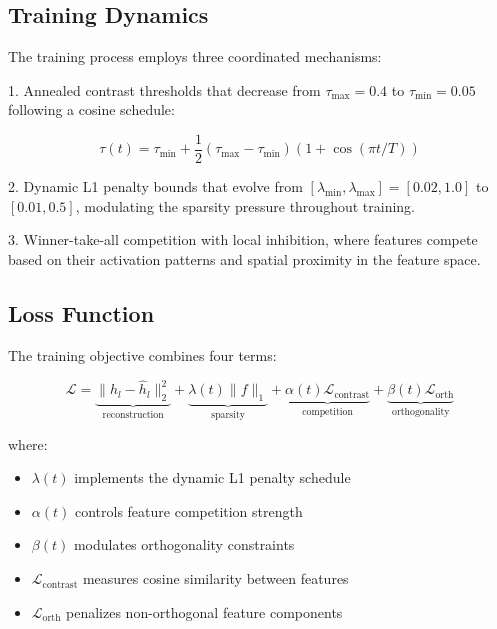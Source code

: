 \documentclass{article} %
\begin{document}
\subsection{Training Dynamics}

The training process employs three coordinated mechanisms:

1. Annealed contrast thresholds that decrease from $\tau_{\text{max}}=0.4$ to $\tau_{\text{min}}=0.05$ following a cosine schedule:

\begin{equation}
\tau(t) = \tau_{\text{min}} + \frac{1}{2}(\tau_{\text{max}} - \tau_{\text{min}})(1 + \cos(\pi t/T))
\end{equation}

2. Dynamic L1 penalty bounds that evolve from $[\lambda_{\text{min}}, \lambda_{\text{max}}] = [0.02, 1.0]$ to $[0.01, 0.5]$, modulating the sparsity pressure throughout training.

3. Winner-take-all competition with local inhibition, where features compete based on their activation patterns and spatial proximity in the feature space.

\subsection{Loss Function}

The training objective combines four terms:

\begin{equation}
\mathcal{L} = \underbrace{\|h_l - \hat{h}_l\|_2^2}_{\text{reconstruction}} + \underbrace{\lambda(t)\|f\|_1}_{\text{sparsity}} + \underbrace{\alpha(t)\mathcal{L}_{\text{contrast}}}_{\text{competition}} + \underbrace{\beta(t)\mathcal{L}_{\text{orth}}}_{\text{orthogonality}}
\end{equation}

where:
\begin{itemize}
\item $\lambda(t)$ implements the dynamic L1 penalty schedule
\item $\alpha(t)$ controls feature competition strength
\item $\beta(t)$ modulates orthogonality constraints
\item $\mathcal{L}_{\text{contrast}}$ measures cosine similarity between features
\item $\mathcal{L}_{\text{orth}}$ penalizes non-orthogonal feature components
\end{itemize}
\end{document}
